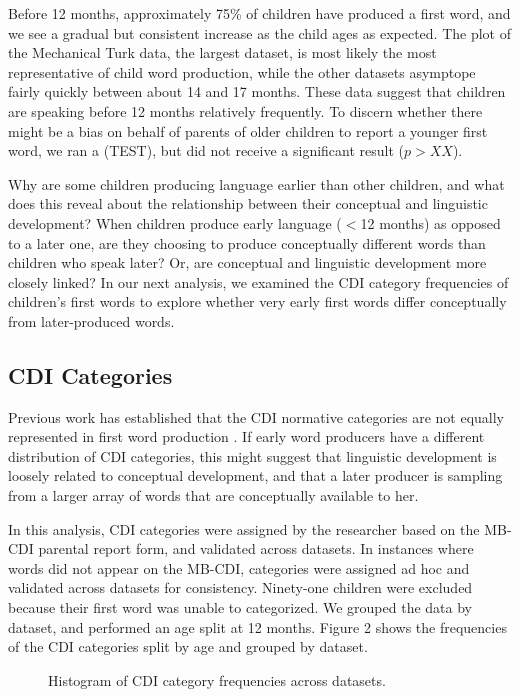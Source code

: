 \documentclass[10pt,letterpaper]{article}
\begin{document}
Before 12 months, approximately 75\% of children have produced a first word, and we see a gradual but consistent increase as the child ages as expected. The plot of the Mechanical Turk data, the largest dataset, is most likely the most representative of child word production, while the other datasets asymptope fairly quickly between about 14 and 17 months. 
These data suggest that children are speaking before 12 months relatively frequently. To discern whether there might be a bias on behalf of parents of older children to report a younger first word, we ran a (TEST), but did not receive a significant result ($p > XX$).

Why are some children producing language earlier than other children, and what does this reveal about the relationship between their conceptual and linguistic development? When children produce early language ($<$12 months) as opposed to a later one, are they choosing to produce conceptually different words than children who speak later? Or, are conceptual and linguistic development more closely linked? In our next analysis, we examined the CDI category frequencies of children's first words to explore whether very early first words differ conceptually from later-produced words. 

\subsection{CDI Categories} 
Previous work has established that the CDI normative categories are not equally represented in first word production \cite{fenson1994}. If early word producers have a different distribution of CDI categories, this might suggest that linguistic development is loosely related to conceptual development, and that a later producer is sampling from a larger array of words that are conceptually available to her.

In this analysis, CDI categories were assigned by the researcher based on the MB-CDI parental report form, and validated across datasets. In instances where words did not appear on the MB-CDI, categories were assigned ad hoc and validated across datasets for consistency. Ninety-one children were excluded because their first word was unable to categorized. We grouped the data by dataset, and performed an age split at 12 months. Figure 2 shows the frequencies of the CDI categories split by age and grouped by dataset.

\begin{figure}[tb]
\caption{\label{fig:cdfs} Histogram of CDI category frequencies across datasets.}
\end{figure}
\end{document}
